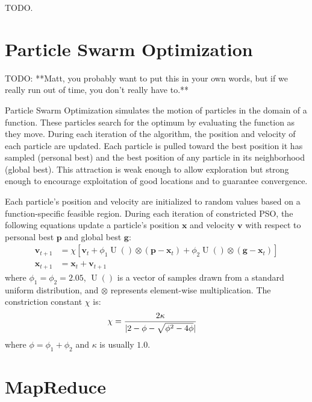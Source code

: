 \documentclass[letterpaper]{sig-alternate}
\renewcommand{\Vec}[1]{\mathbf{#1}}
\DeclareMathOperator{\URand}{U}
\providecommand{\ppos}{\ensuremath{\Vec{x}}}
\providecommand{\pvel}{\ensuremath{\Vec{v}}}
\providecommand{\gbest}{\ensuremath{\Vec{g}}}
\providecommand{\pbest}{\ensuremath{\Vec{p}}}
\providecommand{\constriction}{\ensuremath{\chi}}
\providecommand{\coeff}{\ensuremath{\phi}}
\begin{document}
TODO.


\section{Particle Swarm Optimization}
\label{sec:pso}

TODO: **Matt, you probably want to put this in your own words, but if we
really run out of time, you don't really have to.**

Particle Swarm Optimization simulates the motion of particles in the domain of
a function.  These particles search for the optimum by evaluating the function
as they move.  During each iteration of the algorithm, the position and
velocity of each particle are updated.  Each particle is pulled toward the
best position it has sampled (personal best) and the best position of any
particle in its neighborhood (global best).  This attraction is weak enough to
allow exploration but strong enough to encourage exploitation of good
locations and to guarantee convergence.

Each particle's position and velocity are initialized to random values based
on a function-specific feasible region.  During each iteration of constricted
PSO, the following equations update a particle's position $\ppos$ and velocity
$\pvel$ with respect to personal best $\pbest$ and global best $\gbest$:
\begin{align}
\label{eq:velupdate}
    \pvel_{t+1} &=
        \constriction \left[ \pvel_t + 
            \coeff_1\URand()\otimes(\pbest - \ppos_{t}) +
            \coeff_2\URand()\otimes(\gbest - \ppos_{t})
        \right] \\
\label{eq:posupdate}
    \ppos_{t+1} &= \ppos_t + \pvel_{t+1}
\end{align}
where \(\coeff_1 = \coeff_2 = 2.05\), \(\URand()\) is a vector of samples
drawn from a standard uniform distribution, and \( \otimes \) represents
element-wise multiplication.  The constriction constant \( \constriction \)
is:
\begin{align}
    \notag
    \constriction &= \frac{2 \kappa}{|2 - \coeff - \sqrt{\coeff^2 - 4\coeff}|}
\end{align}
where
$\coeff = \coeff_1 + \coeff_2$ and $\kappa$ is usually
$1.0$.~\citep{clerc-tec02}





\section{MapReduce}
\label{sec:mapreduce}
\end{document}
